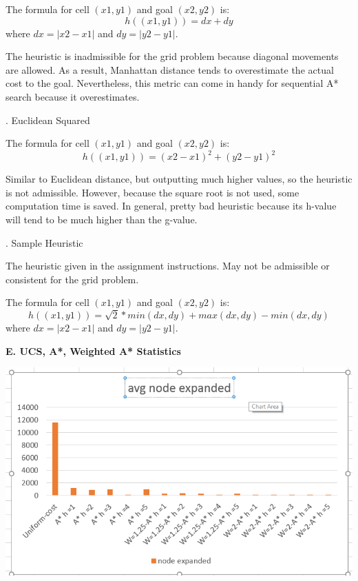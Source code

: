 \documentclass[12pt, letterpaper]{article}
\begin{document}
The formula for cell $(x1, y1)$ and goal $(x2, y2)$ is:
$$h((x1, y1)) = dx + dy$$
where $dx = |x2 - x1|$ and $dy = |y2 - y1|$.

The heuristic is inadmissible for the grid problem because diagonal movements are allowed. As a result, Manhattan distance tends to overestimate the actual cost to the goal. Nevertheless, this metric can come in handy for sequential A* search because it overestimates.

\bigskip
{}. Euclidean Squared

The formula for cell $(x1, y1)$ and goal $(x2, y2)$ is:
$$h((x1,y1)) = (x2-x1)^2 + (y2-y1)^2$$

Similar to Euclidean distance, but outputting much higher values, so the heuristic is not admissible. However, because the square root is not used, some computation time is saved. In general, pretty bad heuristic because its h-value will tend to be much higher than the g-value.

\bigskip
{}. Sample Heuristic

The heuristic given in the assignment instructions. May not be admissible or consistent for the grid problem. 

The formula for cell $(x1, y1)$ and goal $(x2, y2)$ is:
$$h((x1,y1)) = \sqrt{2} * min(dx, dy) + max(dx, dy) - min(dx, dy)$$
where $dx = |x2 - x1|$ and $dy = |y2 - y1|$. 

\pagebreak %

\noindent \textbf{E. UCS, A*, Weighted A* Statistics}

\noindent \includegraphics[scale=0.6]{"avg-nodeexpanded"}

\medskip
\end{document}
